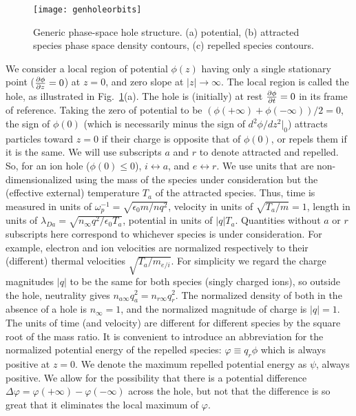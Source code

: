 \documentclass[aip,pop,article-title]{revtex4-2}
\begin{document}
\begin{figure}
  \center
  \texttt{[image: genholeorbits]}
  \caption{Generic phase-space hole structure. (a) potential, (b)
    attracted species phase space density contours, (c) repelled
    species contours.\label{structure}}
\end{figure}

We consider a local region of potential $\phi(z)$ having only a single
stationary point (${\partial\phi\over \partial z}=0$) at $z=0$, and
zero slope at $|z|\to \infty$. The local region is called the hole, as
illustrated in Fig.\ \ref{structure}(a). The hole is (initially) at
rest ${\partial \phi\over\partial t}=0$ in its frame of
reference. Taking the zero of potential to be
$(\phi(+\infty)+\phi(-\infty))/2=0$, the sign of $\phi(0)$ (which is
necessarily minus the sign of $d^2\phi/dz^2|_0$) attracts particles
toward $z=0$ if their charge is opposite that of $\phi(0)$, or repels
them if it is the same. We will use subscripts $a$ and $r$ to denote
attracted and repelled. So, for an ion hole ($\phi(0)\le 0$),
$i\leftrightarrow a$, and $e\leftrightarrow r$.  We use units that are
non-dimensionalized using the mass of the species under consideration
but the (effective external) temperature $T_a$ of the attracted
species.  Thus, time is measured in units of
$\omega_{p}^{-1}=\sqrt{\epsilon_0 m/n q^2}$, velocity in units of
$\sqrt{T_a/m}=1$, length in units of
$\lambda_{Da}=\sqrt{n_{\infty} q^2/\epsilon_0T_a}$, potential in units
of $|q|T_a$. Quantities without $a$ or $r$ subscripts here correspond
to whichever species is under consideration. For example,
electron and ion velocities are normalized respectively to their
(different) thermal velocities $\sqrt{T_a/m_{e/i}}$. For simplicity we
regard the charge magnitudes $|q|$ to be the same for both species
(singly charged ions), so outside the hole, neutrality gives
$n_{a\infty}q_a^2=n_{r\infty}q_r^2$. The normalized density of both
in the absence of a hole is $n_\infty=1$, and the normalized magnitude
of charge is $|q|=1$. The units of time (and velocity) are different
for different species by the square root of the mass ratio. It is
convenient to introduce an abbreviation for the normalized potential
energy of the repelled species: $\varphi \equiv q_r\phi$ which is
always positive at $z=0$. We denote the maximum repelled potential
energy as $\psi$, always positive.  We allow for the possibility that
there is a potential difference
$\Delta \varphi =\varphi(+\infty)-\varphi(-\infty)$ across the hole,
but not that the difference is so great that it eliminates the local
maximum of $\varphi$.
\end{document}

